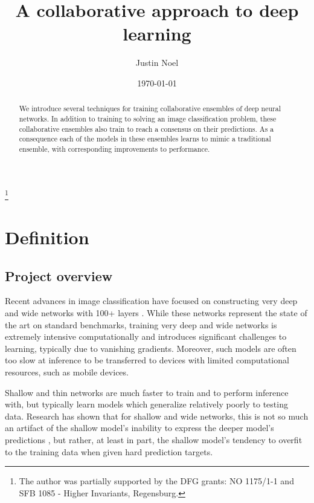 \documentclass[english,a4paper,oneside]{amsart}
\theoremstyle{definition}
\begin{document}
	\title{A collaborative approach to deep learning}

	\author{Justin Noel}
	\address{University of Regensburg\\
	NWF I - Mathematik; Regensburg, Germany}
	 \thanks{The author was partially supported by the DFG grants: NO 1175/1-1 and SFB 1085 - Higher Invariants, Regensburg. }


\date{\today}

\begin{abstract}
	We introduce several techniques for training collaborative ensembles of deep neural networks. In addition to training to solving an image classification problem, these collaborative ensembles also train to reach a consensus on their predictions. As a consequence each of the models in these ensembles learns to mimic a traditional ensemble, with corresponding improvements to performance. %
\end{abstract}

\maketitle
 
\tableofcontents

\section{Definition}
\subsection{Project overview}
Recent advances in image classification have focused on constructing very deep and wide networks with 100+ layers \cite{ResNet,Inception}. While these networks represent the state of the art on standard benchmarks, training very deep and wide networks is extremely intensive computationally and introduces significant challenges to learning, typically due to vanishing gradients. Moreover, such models are often too slow at inference to be transferred to devices with limited computational resources, such as mobile devices. 

Shallow and thin networks are much faster to train and to perform inference with, but typically learn models which generalize relatively poorly to testing data. Research has shown that for shallow and wide networks, this is not so much an artifact of the shallow model's inability to express the deeper model's predictions \cite{Distillation,Shallow,Compression}, but rather, at least in part, the shallow model's tendency to overfit to the training data when given hard prediction targets. 
\end{document}
